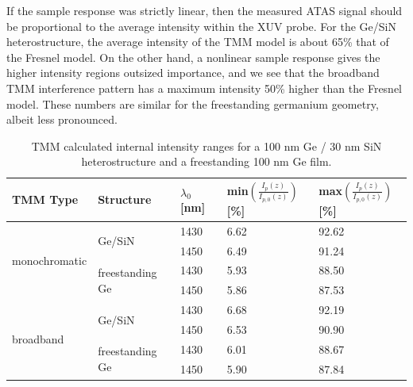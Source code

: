 If the sample response was strictly linear, then the measured ATAS signal should be proportional to the average intensity within the XUV probe. For the Ge/SiN heterostructure, the average intensity of the TMM model is about 65\% that of the Fresnel model. On the other hand, a nonlinear sample response gives the higher intensity regions outsized importance, and we see that the broadband TMM interference pattern has a maximum intensity 50\% higher than the Fresnel model. These numbers are similar for the freestanding germanium geometry, albeit less pronounced.

\begin{table}[]
	\centering
	\begin{tabular}{l|l|l|l|l}
		\textbf{TMM Type} &
		\textbf{Structure} &
		\textbf{$\lambda_0$ {[}nm{]}} &
		\textbf{min$\left(\frac{I_p(z)}{I_{p,0}(z)}\right)$ {[}\%{]}} &
		\textbf{max$\left(\frac{I_p(z)}{I_{p,0}(z)}\right)$ {[}\%{]}} \\ \hline
		\multirow{4}{*}{monochromatic} & \multirow{2}{*}{Ge/SiN}          & 1430 & 6.62 & 92.62 \\
		&                                  & 1450 & 6.49 & 91.24\\ \cline{2-5} 
		& \multirow{2}{*}{freestanding Ge} & 1430 & 5.93 & 88.50 \\
		&                                  & 1450 & 5.86 & 87.53 \\ \hline
		\multirow{4}{*}{broadband}     & \multirow{2}{*}{Ge/SiN}          & 1430 & 6.68 & 92.19 \\
		&                                  & 1450 & 6.53 & 90.90 \\ \cline{2-5} 
		& \multirow{2}{*}{freestanding Ge} & 1430 & 6.01 & 88.67 \\
		&                                  & 1450 & 5.90 & 87.84
	\end{tabular}
	\caption{TMM calculated internal intensity ranges for a 100 nm Ge / 30 nm SiN heterostructure and a freestanding 100 nm Ge film.}
	\label{tab:TMM_intensity_range}
\end{table}
